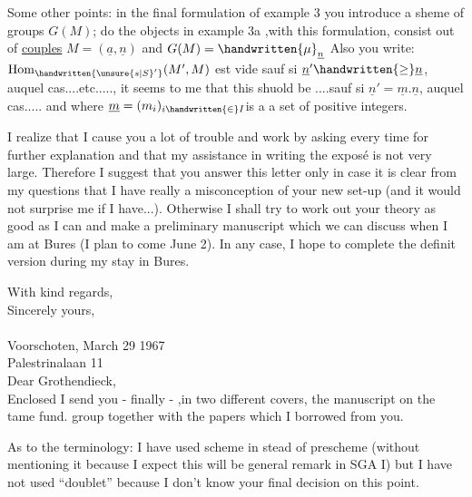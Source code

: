 Some other points: in the final formulation of example 3 you introduce a sheme of groups $G(M)$;  do the objects in example 3a ,with this formulation, consist out of \uline{couples} $M=(\underline{a},\underline{n})$ and $G(M)=\handwritten{\mu}_{\underline{n}}$  Also you write: $\mathrm{Hom}_{\handwritten{\unsure{s|S}'}}(M',M)$ est vide sauf si $\underline{n}'\handwritten{\geq}\underline{n}$, auquel cas....etc....., it seems to me that this shuold be ....sauf si $\underline{n}'=\underline{m}.\underline{n}$, auquel cas..... and where $\underline{m}=(m_i)_{i\handwritten{\in}I}$is a a set of positive integers.

I realize that I cause you a lot of trouble and work by asking every time for further explanation and that my assistance in writing the exposé is not very large. Therefore I suggest that you answer this letter only in case it is clear from my questions that I have really a misconception of your new set-up (and it would not surprise me if I have...). Otherwise I shall try to work out your theory as good as I can and make a preliminary manuscript which we can discuss when I am at Bures (I plan to come June 2). In any case, I hope to complete the definit version during my stay in Bures.

With kind regards,\\
Sincerely yours,\\
\\
Voorschoten, March 29 1967\\
Palestrinalaan 11\\

Dear Grothendieck,\\

Enclosed I send you - finally - ,in two different covers, the manuscript on the tame fund. group together with the papers which I borrowed from you.

As to the terminology: I have used scheme in stead of prescheme (without mentioning it because I expect this will be  general remark in SGA I) but I have not used ``doublet'' because I don't know your final decision on this point.

